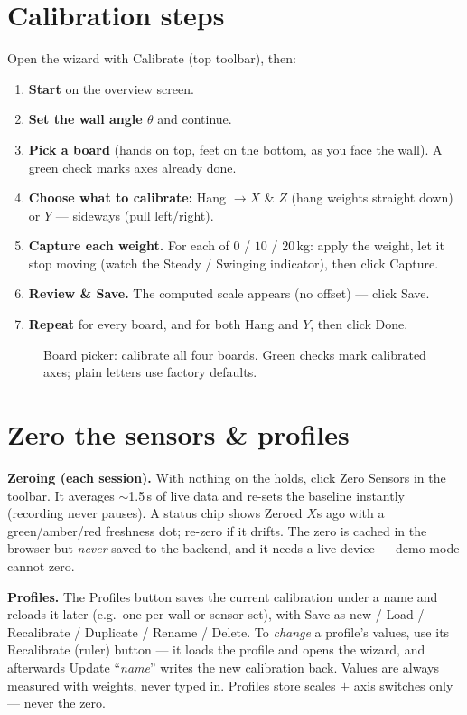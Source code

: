 \documentclass[11pt,a4paper]{article}
\begin{document}
\section{Calibration steps}
Open the wizard with \textsf{Calibrate} (top toolbar), then:
\begin{enumerate}
  \item \textbf{Start} on the overview screen.
  \item \textbf{Set the wall angle $\theta$} and continue.
  \item \textbf{Pick a board} (hands on top, feet on the bottom, as you face the
        wall). A green check marks axes already done.
  \item \textbf{Choose what to calibrate:}
        \textsf{Hang $\rightarrow X$ \& $Z$} (hang weights straight down) or
        \textsf{$Y$ --- sideways} (pull left/right).
  \item \textbf{Capture each weight.} For each of $0$ / $10$ / $20$\,kg: apply the
        weight, let it stop moving (watch the \textsf{Steady / Swinging}
        indicator), then click \textsf{Capture}.
  \item \textbf{Review \& Save.} The computed scale appears (no offset) --- click
        \textsf{Save}.
  \item \textbf{Repeat} for every board, and for both \textsf{Hang} and
        \textsf{$Y$}, then click \textsf{Done}.
\end{enumerate}

\begin{figure}[ht]\centering
{}
\caption{Board picker: calibrate all four boards. Green checks mark calibrated
axes; plain letters use factory defaults.}
\end{figure}

\section{Zero the sensors \& profiles}
\textbf{Zeroing (each session).} With nothing on the holds, click \textsf{Zero
Sensors} in the toolbar. It averages $\sim$1.5\,s of live data and re-sets the
baseline instantly (recording never pauses). A status chip shows \textsf{Zeroed
$X$s ago} with a green/amber/red freshness dot; re-zero if it drifts. The zero is
cached in the browser but \emph{never} saved to the backend, and it needs a live
device --- demo mode cannot zero.

\textbf{Profiles.} The \textsf{Profiles} button saves the current calibration under
a name and reloads it later (e.g.\ one per wall or sensor set), with \textsf{Save as
new} / \textsf{Load} / \textsf{Recalibrate} / \textsf{Duplicate} / \textsf{Rename} /
\textsf{Delete}. To \emph{change} a profile's values, use its \textsf{Recalibrate}
(ruler) button --- it loads the profile and opens the wizard, and afterwards
\textsf{Update ``\emph{name}''} writes the new calibration back. Values are always
measured with weights, never typed in. Profiles store scales $+$ axis switches only
--- never the zero.
\end{document}
